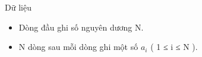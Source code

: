Dữ liệu
\begin{itemize}
	\item     Dòng đầu ghi số nguyên dương N.   
	\item     N dòng sau mỗi dòng ghi một số $a_{i}$    ( 1 ≤ i ≤ N ).   
\end{itemize}